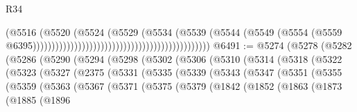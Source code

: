 \begin{lexlean}{R34}
\begin{coremodule}
                                                                              (@5516
                                                                                (@5520
                                                                                  (@5524
                                                                                    (@5529
                                                                                      (@5534
                                                                                        (@5539
                                                                                          (@5544
                                                                                            (@5549
                                                                                              (@5554
                                                                                                (@5559
                                                                                                  @6395)))))))))))))))))))))))))))))))))))))))))))))))
@6491 := @5274
    (@5278
      (@5282
        (@5286
          (@5290
            (@5294
              (@5298
                (@5302
                  (@5306
                    (@5310
                      (@5314
                        (@5318
                          (@5322
                            (@5323
                              (@5327
                                (@2375
                                  (@5331
                                    (@5335
                                      (@5339
                                        (@5343
                                          (@5347
                                            (@5351
                                              (@5355
                                                (@5359
                                                  (@5363
                                                    (@5367
                                                      (@5371
                                                        (@5375
                                                          (@5379
                                                            (@1842
                                                              (@1852
                                                                (@1863
                                                                  (@1873
                                                                    (@1885
                                                                      (@1896

\end{coremodule}
\end{lexlean}
